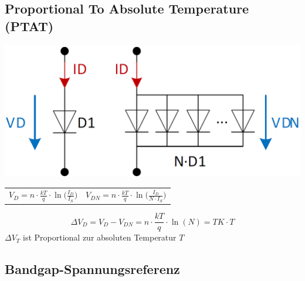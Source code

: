 \subsection{Proportional To Absolute Temperature (PTAT)}

\begin{minipage}[c]{0.28\columnwidth}
    \includegraphics[width=\columnwidth]{images/ptat.png}
\end{minipage}
\hfill
\begin{minipage}[c]{0.7\columnwidth}

    \begin{tabular}{c c}    %
        $V_D = n \cdot \frac{k T}{q} \cdot \ln \Big( \frac{I_D}{I_S} \Big)$ & 
        $V_{DN} = n \cdot \frac{k T}{q} \cdot \ln \Big( \frac{I_D}{N \cdot I_S} \Big)$
    \end{tabular}

    $$ \boxed{ \Delta V_D = V_D - V_{DN} = n \cdot \frac{k T}{q} \cdot \ln(N)  = TK \cdot T }$$
    \textrightarrow $\Delta V_T$ ist Proportional zur absoluten Temperatur $T$
\end{minipage}


\subsection{Bandgap-Spannungsreferenz}

